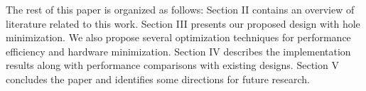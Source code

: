 The rest of this paper is organized as follows: Section II contains an overview of literature related to this work.
Section III presents our proposed design with hole minimization.
We also propose several optimization techniques for performance efficiency and hardware minimization.
Section IV describes the implementation results along with performance comparisons with existing designs.
Section V concludes the paper and identifies some directions for future research.

